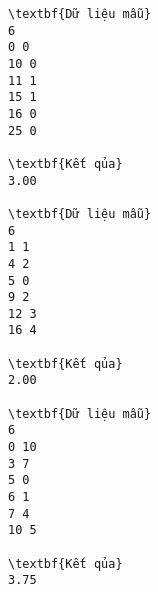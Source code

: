 \begin{verbatim}
\textbf{Dữ liệu mẫu}
6 
0 0 
10 0 
11 1 
15 1 
16 0 
25 0

\textbf{Kết qủa}
3.00

\textbf{Dữ liệu mẫu}
6
1 1
4 2
5 0
9 2
12 3
16 4

\textbf{Kết qủa}
2.00

\textbf{Dữ liệu mẫu}
6
0 10
3 7
5 0
6 1
7 4
10 5

\textbf{Kết qủa}
3.75
\end{verbatim}